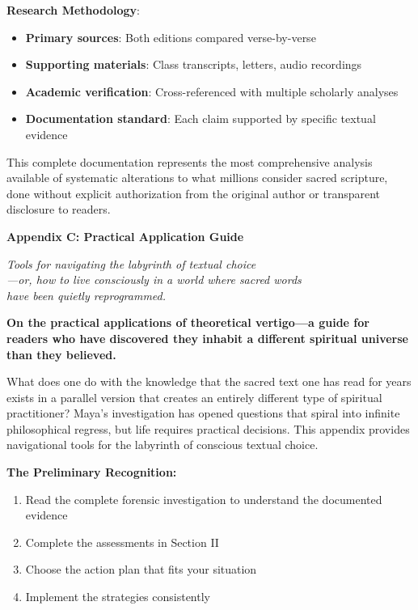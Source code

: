 \documentclass[11pt,twoside]{book}
\begin{document}
\textbf{\textbf{Research Methodology}}: 
\begin{itemize}
\item \textbf{\textbf{Primary sources}}: Both editions compared verse-by-verse
\item \textbf{\textbf{Supporting materials}}: Class transcripts, letters, audio recordings
\item \textbf{\textbf{Academic verification}}: Cross-referenced with multiple scholarly analyses
\item \textbf{\textbf{Documentation standard}}: Each claim supported by specific textual evidence
\end{itemize}

This complete documentation represents the most comprehensive analysis available of systematic alterations to what millions consider sacred scripture, done without explicit authorization from the original author or transparent disclosure to readers.

\clearpage
\thispagestyle{empty}
\mbox{}
\newpage
\pagestyle{sectionopening}
\thispagestyle{sectionopening}
\markboth{}{}
\markright{}
\vspace*{0.25\textheight}
\begin{center}
{\Huge\bfseries Appendix C: Practical Application Guide}
\end{center}
\newpage

{\centering\itshape Tools for navigating the labyrinth of textual choice\\—or, how to live consciously in a world where sacred words\\have been quietly reprogrammed.\par}
\vspace{0.3cm}

\normalfont\justifying
\textbf{On the practical applications of theoretical vertigo—a guide for readers who have discovered they inhabit a different spiritual universe than they believed.}

What does one do with the knowledge that the sacred text one has read for years exists in a parallel version that creates an entirely different type of spiritual practitioner? Maya's investigation has opened questions that spiral into infinite philosophical regress, but life requires practical decisions. This appendix provides navigational tools for the labyrinth of conscious textual choice.

\textbf{\textbf{The Preliminary Recognition:}}
\begin{enumerate}
\item Read the complete forensic investigation to understand the documented evidence
\item Complete the assessments in Section II
\item Choose the action plan that fits your situation
\item Implement the strategies consistently
\end{enumerate}
\end{document}
